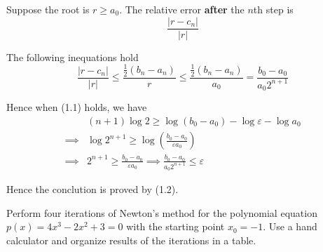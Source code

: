\documentclass[11pt]{elegantbook}
\begin{document}
\begin{solution}
  Suppose the root is $r\geq a_0$. The relative error \textbf{after} the $n$th step is
  \begin{equation}
    \frac{|r-c_n|}{|r|}
  \end{equation}
  
  The following inequations hold
  \begin{equation}
    \frac{|r-c_n|}{|r|} \leq \frac{\frac{1}{2}(b_n-a_n)}{r} \leq \frac{\frac{1}{2}(b_n-a_n)}{a_0} = \frac{b_0-a_0}{a_0 2^{n+1}}
  \end{equation}

  Hence when (1.1) holds, we have
  \begin{align*}
   & (n+1)\log 2 \geq \log(b_0-a_0) -\log\varepsilon -\log a_0\\
  \implies & \log 2^{n+1} \geq \log \left(\frac{b_0-a_0}{\varepsilon a_0}\right)\\
  \implies & 2^{n+1} \geq \frac{b_0-a_0}{\varepsilon a_0} \implies \frac{b_0-a_0}{a_0 2^{n+1}} \leq \varepsilon
  \end{align*}

  Hence the conclution is proved by (1.2).
\end{solution}

\vspace{1.5em}

\begin{problem}
  Perform four iterations of Newton's method for the polynomial equation $p(x)=4x^3-2x^2+3=0$ with the starting point $x_0=-1$. Use a hand calculator and organize results of the iterations in a table.
\end{problem}
\end{document}
